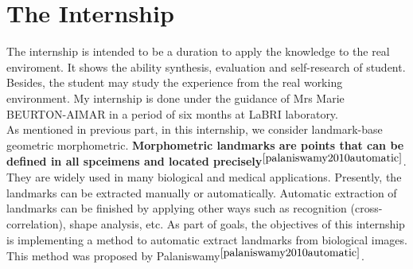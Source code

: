 \section{The Internship}
The internship is intended to be a duration to apply the knowledge to the real enviroment. It shows the ability synthesis, evaluation and self-research of student. Besides, the student may study the experience from the real working environment. My internship is done under the guidance of Mrs Marie BEURTON-AIMAR in a period of six months at LaBRI laboratory.\\
As mentioned in previous part, in this internship, we consider landmark-base geometric morphometric. \textbf{Morphometric landmarks are points that can be defined in all spceimens and located precisely}$^{\cite{palaniswamy2010automatic}}$. They are widely used in many biological and medical applications. Presently, the landmarks can be extracted manually or automatically. Automatic extraction of landmarks can be finished by applying other ways such as recognition (cross-correlation), shape analysis, etc. As part of goals, the objectives of this internship is implementing a method to automatic extract landmarks from biological images. This method was proposed by Palaniswamy$^{\cite{palaniswamy2010automatic}}$.






























